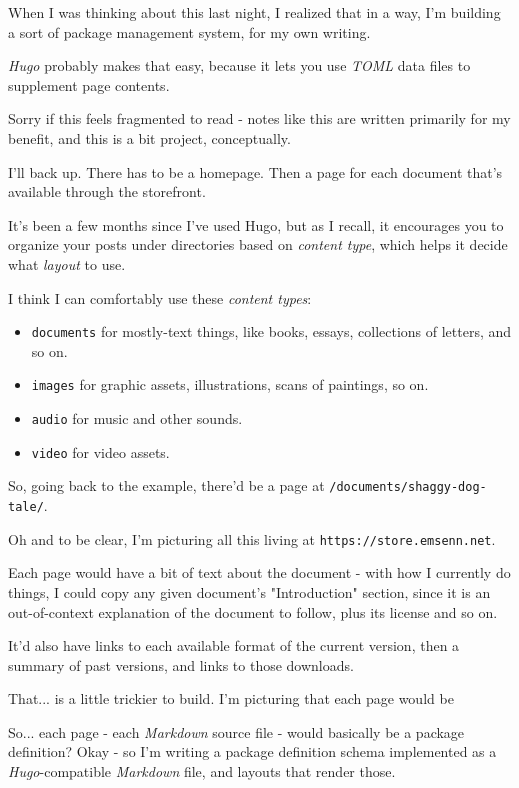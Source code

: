 \documentclass[11pt]{article}
\begin{document}
When I was thinking about this last night, I realized that in a way,
I'm building a sort of package management system, for my own writing.

\emph{Hugo} probably makes that easy, because it lets you use \emph{TOML} data
files to supplement page contents.

Sorry if this feels fragmented to read - notes like this are written
primarily for my benefit, and this is a bit project, conceptually.

I'll back up. There has to be a homepage. Then a page for each
document that's available through the storefront.

It's been a few months since I've used Hugo, but as I recall, it
encourages you to organize your posts under directories based on
\emph{content type}, which helps it decide what \emph{layout} to use.

I think I can comfortably use these \emph{content types}:
\begin{itemize}
\item \texttt{documents} for mostly-text things, like books, essays, collections
of letters, and so on.
\item \texttt{images} for graphic assets, illustrations, scans of paintings, so
on.
\item \texttt{audio} for music and other sounds.
\item \texttt{video} for video assets.
\end{itemize}

So, going back to the example, there'd be a page at
\texttt{/documents/shaggy-dog-tale/}.

Oh and to be clear, I'm picturing all this living at
\texttt{https://store.emsenn.net}.

Each page would have a bit of text about the document - with how I
currently do things, I could copy any given document's "Introduction"
section, since it is an out-of-context explanation of the document to
follow, plus its license and so on.

It'd also have links to each available format of the current version,
then a summary of past versions, and links to those downloads.

That... is a little trickier to build. I'm picturing that each page
would be

So... each page - each \emph{Markdown} source file - would basically be a package
definition? Okay - so I'm writing a package definition schema
implemented as a \emph{Hugo}-compatible \emph{Markdown} file, and layouts that
render those.
\end{document}
